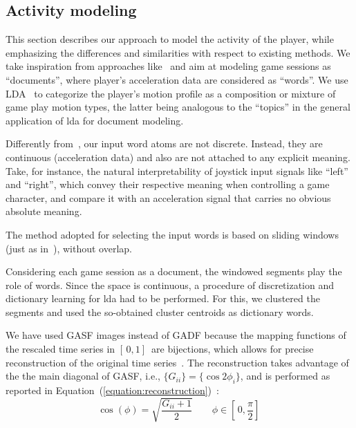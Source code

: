 \subsection{Activity modeling}
This section describes our approach to model the activity of the player, while emphasizing the differences and similarities with respect to existing methods. We take inspiration from approaches like~\cite{smith_mining_2016, wang_encoding_2015, wang_imaging_2015} and aim at modeling game sessions as ``documents'', where player's acceleration data are considered as ``words''. We use LDA~\cite{blei_latent_2003} to categorize the player's motion profile as a composition or mixture of game play motion types, the latter being analogous to the ``topics'' in the general application of \gls{lda} for document modeling.

Differently from~\cite{smith_mining_2016}, our input word atoms are not discrete. Instead, they are continuous (acceleration data) and also are not attached to any explicit meaning. Take, for instance, the natural interpretability of joystick input signals like ``left'' and ``right'', which convey their respective meaning when controlling a game character, and compare it with an acceleration signal that carries no obvious absolute meaning.

The method adopted for selecting the input words is based on sliding windows (just as in~\cite{smith_mining_2016}), without overlap. %

Considering each game session as a document, the windowed segments play the role of words. Since the space is continuous, a procedure of discretization and dictionary learning for \gls{lda} had to be performed. For this, we clustered the segments and used the so-obtained cluster centroids as dictionary words.

We have used GASF images instead of GADF because the mapping functions of the rescaled time series in $[\,0,1]\,$ are bijections, which allows for precise reconstruction of the original time series~\cite{wang_imaging_2015}. The reconstruction takes advantage of the the main diagonal of GASF, i.e., $\{G_{ii}\} = \{\cos{2\phi_{i}}\}$, and is performed as reported in Equation~(\ref{equation:reconstruction})~\cite{wang_imaging_2015}: 
\begin{equation}\label{equation:reconstruction}
\cos(\phi)=\sqrt{\frac{G_{ii}+1}{2}} \qquad \phi \in [\,0,\frac{\pi}{2}]\,
\end{equation}

